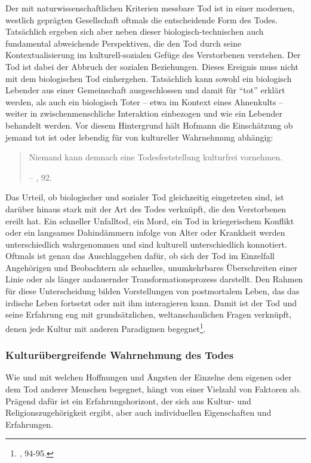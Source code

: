 \documentclass[openany,twoside,twocolumn]{book}
\let\rmarkdownfootnote\footnote%
\def\footnote{\protect\rmarkdownfootnote}
\begin{document}
Der mit naturwissenschaftlichen Kriterien messbare Tod ist in einer
modernen, westlich geprägten Gesellschaft oftmals die entscheidende Form
des Todes. Tatsächlich ergeben sich aber neben dieser
biologisch-technischen auch fundamental abweichende Perspektiven, die
den Tod durch seine Kontextualisierung im kulturell-sozialen Gefüge des
Verstorbenen verstehen. Der Tod ist dabei der Abbruch der sozialen
Beziehungen. Dieses Ereignis muss nicht mit dem biologischen Tod
einhergehen. Tatsächlich kann sowohl ein biologisch Lebender aus einer
Gemeinschaft ausgeschlossen und damit für ``tot'' erklärt werden, als
auch ein biologisch Toter -- etwa im Kontext eines Ahnenkults -- weiter
in zwischenmenschliche Interaktion einbezogen und wie ein Lebender
behandelt werden. Vor diesem Hintergrund hält Hofmann die Einschätzung
ob jemand tot ist oder lebendig für von kultureller Wahrnehmung
abhängig:

\begin{quote}
Niemand kann demnach eine Todesfeststellung kulturfrei vornehmen.

-- \textcite{hofmann_rituelle_2008}, 92.
\end{quote}

Das Urteil, ob biologischer und sozialer Tod gleichzeitig eingetreten
sind, ist darüber hinaus stark mit der Art des Todes verknüpft, die den
Verstorbenen ereilt hat. Ein schneller Unfalltod, ein Mord, ein Tod in
kriegerischem Konflikt oder ein langsames Dahindämmern infolge von Alter
oder Krankheit werden unterschiedlich wahrgenommen und sind kulturell
unterschiedlich konnotiert. Oftmals ist genau das Auschlaggeben dafür,
ob sich der Tod im Einzelfall Angehörigen und Beobachtern als schnelles,
unumkehrbares Überschreiten einer Linie oder als länger andauernder
Transformationsprozess darstellt. Den Rahmen für diese Unterscheidung
bilden Vorstellungen von postmortalem Leben, das das irdische Leben
fortsetzt oder mit ihm interagieren kann. Damit ist der Tod und seine
Erfahrung eng mit grundsätzlichen, weltanschaulichen Fragen verknüpft,
denen jede Kultur mit anderen Paradigmen begegnet\footnote{\textcite{hofmann_rituelle_2008},
  94-95.}.

\hypertarget{kulturubergreifende-wahrnehmung-des-todes}{%
\subsubsection{Kulturübergreifende Wahrnehmung des
Todes}\label{kulturubergreifende-wahrnehmung-des-todes}}

Wie und mit welchen Hoffnungen und Ängsten der Einzelne dem eigenen oder
dem Tod anderer Menschen begegnet, hängt von einer Vielzahl von Faktoren
ab. Prägend dafür ist ein Erfahrungshorizont, der sich aus Kultur- und
Religionszugehörigkeit ergibt, aber auch individuellen Eigenschaften und
Erfahrungen.
\end{document}
